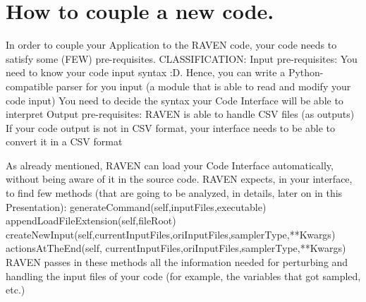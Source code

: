 \section{How to couple a new code.  \\ \vspace{2 mm} {\small }}
\label{sec:newCodeCoupling}
In order to couple your Application to the RAVEN code, your code needs to satisfy some (FEW) pre-requisites.
CLASSIFICATION:
Input pre-requisites:
You need to know your code input syntax :D. Hence, you can write a Python-compatible parser for you input (a module that is able to read and modify your code input)
You need to decide the syntax your Code Interface will be able to interpret 
Output pre-requisites:
RAVEN is able to handle CSV files (as outputs)
If your code output is not in CSV format, your interface needs to be able to convert it in a CSV format





As already mentioned, RAVEN can load your Code Interface automatically, without being aware of it in the source code.
RAVEN expects, in your interface, to find few methods (that are going to be analyzed, in details, later on in this Presentation):
generateCommand(self,inputFiles,executable)
appendLoadFileExtension(self,fileRoot)
createNewInput(self,currentInputFiles,oriInputFiles,samplerType,**Kwargs)
actionsAtTheEnd(self, currentInputFiles,oriInputFiles,samplerType,**Kwargs)
RAVEN passes in these methods all  the information needed for perturbing and handling the input files of your code (for example, the variables that got sampled, etc.)

 